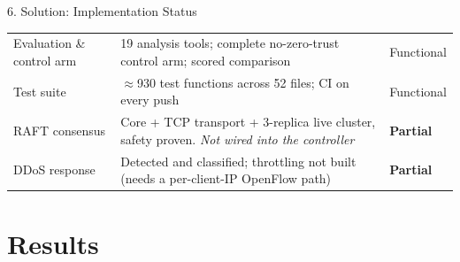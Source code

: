 \documentclass[aspectratio=169, 11pt]{beamer}
\begin{document}
\begin{frame}{6. Solution: Implementation Status}
\begin{tabular}{@{}p{}p{}l@{}}
      Evaluation \& control arm & 19 analysis tools; complete no-zero-trust control arm; scored comparison & Functional\\
      Test suite               & $\approx$930 test functions across 52 files; CI on every push & Functional\\
      RAFT consensus           & Core + TCP transport + 3-replica live cluster, safety proven. \emph{Not wired into the controller} & \textbf{Partial}\\
      DDoS response            & Detected and classified; throttling not built (needs a per-client-IP OpenFlow path) & \textbf{Partial}\\
      \bottomrule
    \end{tabular}
\end{frame}

\section{Results}
\end{document}
